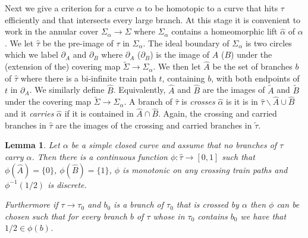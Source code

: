 \documentclass[11pt]{article}
\newtheorem{lemma}[thm]{Lemma}
\theoremstyle{remark}
\begin{document}
Next we give a criterion for a curve $\alpha$ to be homotopic to a curve that hits $\tau$ efficiently and that intersects every large branch. At this stage it is convenient to work in the annular cover $\Sigma_\alpha\to \Sigma$ where $\Sigma_\alpha$ contains a homeomorphic lift $\hat\alpha$ of $\alpha$. We let $\hat\tau$ be the pre-image of $\tau$ in $\Sigma_\alpha$. The ideal boundary of $\Sigma_\alpha$ is two circles which we label $\partial_A$ and $\partial_B$ where $\partial_A$ ($\partial_B$) is the image of $A$ ($B$) under the (extension of the) covering map $\tilde\Sigma\to\Sigma_\alpha$. We then let $\hat A$ be the set of branches $b$ of $\hat\tau$ where there is a bi-infinite train path $t$, containing $b$, with both endpoints of $t$ in $\partial_A$. We similarly define $\hat B$. Equivalently, $\hat A$ and $\hat B$ are the images of $\tilde A$ and $\tilde B$ under the covering map $\tilde\Sigma\to \Sigma_\alpha$. A branch of $\hat\tau$ is {\em crosses} $\hat\alpha$ is it is in $\hat\tau\smallsetminus \hat A \cup \hat B$ and it {\em carries} $\hat\alpha$ if it is contained in $\hat A \cap \hat B$. Again, the crossing and carried branches in $\hat\tau$ are the images of the crossing and carried branches in $\tilde\tau$.


\begin{lemma}\label{transverse function}
Let $\alpha$ be a simple closed curve and assume that no branches of $\tau$ carry $\alpha$.
Then there is a continuous function $\phi\colon \hat\tau \to [0,1]$ such that $\phi(\hat{A}) =\{0\}$, $\phi(\hat{B}) = \{1\}$, $\phi$ is monotonic on any crossing train paths and $\phi^{-1}(1/2)$ is discrete.

Furthermore if $\tau \to \tau_0$ and $b_0$ is a branch of $\tau_0$ that is crossed by $\alpha$ then $\phi$ can be chosen such that for every branch $b$ of $\tau$ whose in $\tau_0$ contains $b_0$ we have that $1/2 \in \phi(b)$.
\end{lemma}
\end{document}

